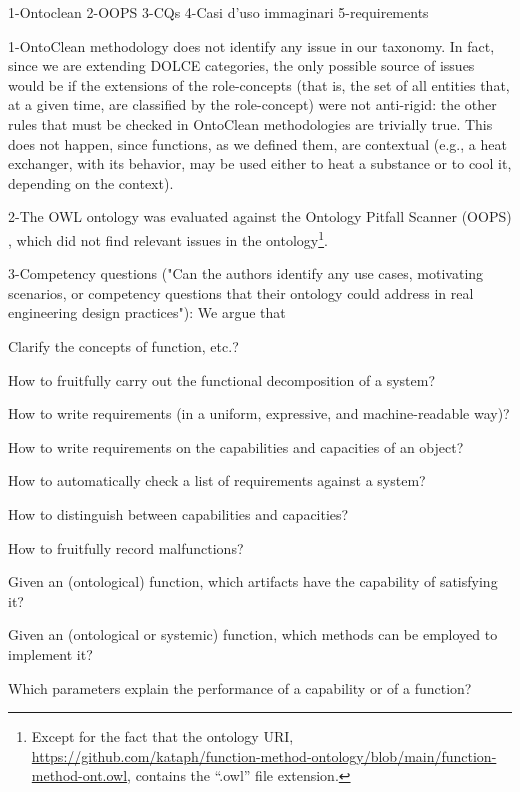 \documentclass[sw]{iosart2x}
\newcommand{\bflist}{\begin{list}{}{\setlength{\topsep}{2mm}\setlength{\partopsep}{0mm}\setlength{\parsep}{0mm}\setlength{\leftmargin}{9mm}\setlength{\labelwidth}{8mm}}}
\newcommand{\eflist}{\end{list}}
\newcommand{\CQLabel}{\textrm{CQ}}
\newcounter{cntCQ}
\newcommand{\myCQ}[1]{\refstepcounter{cntCQ}\begin{small}{\bf \CQLabel\thecntCQ\label{CQ:#1}}\end{small}}
\newcommand{\DOLCE}{\textsc{DOLCE}\xspace} %
\newcommand{\OWL}{\textnormal{OWL}\xspace}
\newcommand{\qquotes}[1]{``#1''}
\newcommand{\TODO}[1]{{\color{red} #1
}}
\begin{document}
\TODO{

1-Ontoclean
2-OOPS
3-CQs
4-Casi d'uso immaginari
5-requirements

1-OntoClean methodology \cite{guarinoOverviewOntoClean2009} does not identify any issue in our taxonomy.
In fact, since we are extending \DOLCE categories, the only possible source of issues would be if the extensions of the role-concepts (that is, the set of all entities that, at a given time, are classified by the role-concept) were not anti-rigid: the other rules that must be checked in OntoClean methodologies are trivially true. 
This does not happen, since functions, as we defined them, are contextual (e.g., a heat exchanger, with its behavior, may be used either to heat a substance or to cool it, depending on the context). 

2-The \OWL ontology was evaluated against the Ontology Pitfall Scanner (OOPS) \cite{poveda2014oops}, which did not find relevant issues in the ontology\footnote{Except for the fact that the ontology URI, \url{https://github.com/kataph/function-method-ontology/blob/main/function-method-ont.owl}, contains the \qquotes{.owl} file extension.}.


3-Competency questions ("Can the authors identify any use cases, motivating scenarios, or competency questions that their ontology could address in real engineering design practices"):
We argue that 
\bflist
  \item[\myCQ{RQ1}] Clarify the concepts of function, etc.?
  \item[\myCQ{RQ2}] How to fruitfully carry out the functional decomposition of a system?
  \item[\myCQ{RQ3}] How to write requirements (in a uniform, expressive, and machine-readable way)?
  \item[\myCQ{RQ4}] How to write requirements on the capabilities and capacities of an object? 
  \item[\myCQ{RQ5}] How to automatically check a list of requirements against a system?
  \item[\myCQ{RQ6}] How to distinguish between capabilities and capacities?
  \item[\myCQ{RQ7}] How to fruitfully record malfunctions?
\eflist
\bflist
  \item[\myCQ{cq2}] Given an (ontological) function, which artifacts have the capability of satisfying it?
  \item[\myCQ{cq3}] Given an (ontological or systemic) function, which methods can be employed to implement it?
  \item[\myCQ{cq8}] Which parameters explain the performance of a capability or of a function?
\eflist

}
\end{document}
